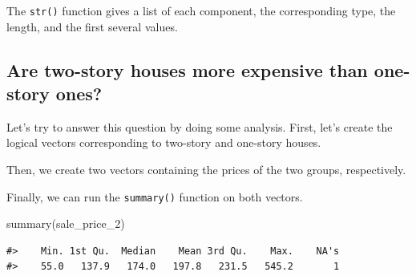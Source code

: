 \documentclass[
]{book}
\newenvironment{Shaded}{\begin{snugshade}}{\end{snugshade}}
\newcommand{\FunctionTok}[1]{\textcolor[rgb]{0.00,0.00,0.00}{#1}}
\newcommand{\NormalTok}[1]{#1}
\newcommand{\OtherTok}[1]{\textcolor[rgb]{0.56,0.35,0.01}{#1}}
\newcommand{\SpecialCharTok}[1]{\textcolor[rgb]{0.00,0.00,0.00}{#1}}
\newcommand{\StringTok}[1]{\textcolor[rgb]{0.31,0.60,0.02}{#1}}
\begin{document}
The \texttt{str()} function gives a list of each component, the corresponding type, the length, and the first several values.

\hypertarget{are-two-story-houses-more-expensive-than-one-story-ones}{%
\subsection{Are two-story houses more expensive than one-story ones?}\label{are-two-story-houses-more-expensive-than-one-story-ones}}

Let's try to answer this question by doing some analysis. First, let's create the logical vectors corresponding to two-story and one-story houses.

\begin{Shaded}
\end{Shaded}

Then, we create two vectors containing the prices of the two groups, respectively.

\begin{Shaded}
\end{Shaded}

Finally, we can run the \texttt{summary()} function on both vectors.

\begin{Shaded}
\begin{Highlighting}[]
\FunctionTok{summary}\NormalTok{(sale\_price\_2)}
\end{Highlighting}
\end{Shaded}

\begin{verbatim}
#>    Min. 1st Qu.  Median    Mean 3rd Qu.    Max.    NA's 
#>    55.0   137.9   174.0   197.8   231.5   545.2       1
\end{verbatim}
\end{document}
